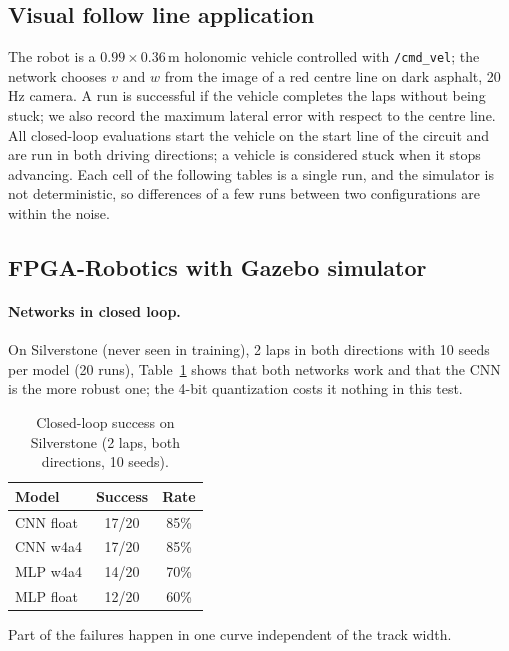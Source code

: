 \documentclass{article}
\begin{document}
\subsection{Visual follow line application}
The robot is a $0.99{\times}0.36$\,m holonomic vehicle controlled with \texttt{/cmd\_vel}; the network chooses $v$ and $w$ from the image of a red centre line
on dark asphalt, 20\,Hz camera. A run is successful if the vehicle completes the laps without being stuck; we also record the maximum lateral error with respect to the centre line.
All closed-loop evaluations start the vehicle on the start line of the circuit and are run in both driving directions; a vehicle is considered stuck when it stops advancing.
Each cell of the following tables is a single run, and the simulator is not deterministic, so differences of a few runs between two configurations are within the noise.

\subsection{FPGA-Robotics with Gazebo simulator}
\paragraph{Networks in closed loop.}
On Silverstone (never seen in training), 2 laps in both directions with 10 seeds per model (20 runs), Table~\ref{tab:sil} shows that both networks work and that the CNN is the more robust one;
the 4-bit quantization costs it nothing in this test.
\begin{table}[h]
\centering
\caption{Closed-loop success on Silverstone (2 laps, both directions, 10 seeds).}
\label{tab:sil}
\begin{tabular}{lcc}
\toprule
Model & Success & Rate\\
\midrule
CNN float & 17/20 & 85\%\\
CNN w4a4 & 17/20 & 85\%\\
MLP w4a4 & 14/20 & 70\%\\
MLP float & 12/20 & 60\%\\
\bottomrule
\end{tabular}
\end{table}
Part of the failures happen in one curve independent of the track width.
\end{document}
